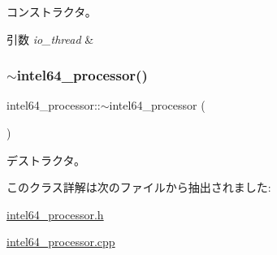コンストラクタ。 
\begin{DoxyParams}{引数}
{\em io\+\_\+thread} & \\
\hline
\end{DoxyParams}
\hypertarget{classintel64__processor_ad3532e98841618af0b850b7c0186fd8d}{}\label{classintel64__processor_ad3532e98841618af0b850b7c0186fd8d} 
\subsubsection{\texorpdfstring{$\sim$intel64\+\_\+processor()}{~intel64\_processor()}}
{\footnotesize\ttfamily intel64\+\_\+processor\+::$\sim$intel64\+\_\+processor (\begin{DoxyParamCaption}{ }\end{DoxyParamCaption})\hspace{0.3cm}{\ttfamily [virtual]}}

デストラクタ。 

このクラス詳解は次のファイルから抽出されました\+:\begin{DoxyCompactItemize}
\item 
\hyperlink{intel64__processor_8h}{intel64\+\_\+processor.\+h}\item 
\hyperlink{intel64__processor_8cpp}{intel64\+\_\+processor.\+cpp}\end{DoxyCompactItemize}
